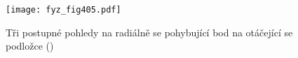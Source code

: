   \begin{figure}[ht!] %
    \centering
    \texttt{[image: fyz\_fig405.pdf]}
    \caption{Tři postupné pohledy na radiálně se pohybující bod na otáčející se podložce
             (\cite[s.~269]{Feynman01})}
    \label{fyz:fig405}
  \end{figure}

